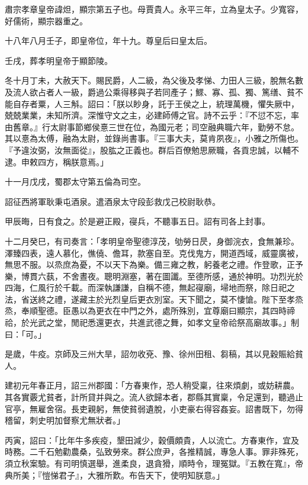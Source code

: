 
\begin{pinyinscope}
肅宗孝章皇帝諱炟，顯宗第五子也。母賈貴人。永平三年，立為皇太子。少寬容，好儒術，顯宗器重之。

十八年八月壬子，即皇帝位，年十九。尊皇后曰皇太后。

壬戌，葬孝明皇帝于顯節陵。

冬十月丁未，大赦天下。賜民爵，人二級，為父後及孝悌、力田人三級，脫無名數及流人欲占者人一級，爵過公乘得移與子若同產子；鰥、寡、孤、獨、篤缮、貧不能自存者粟，人三斛。詔曰：「朕以眇身，託于王侯之上，統理萬機，懼失厥中，兢兢業業，未知所濟。深惟守文之主，必建師傅之官。詩不云乎：『不愆不忘，率由舊章。』行太尉事節鄉侯憙三世在位，為國元老；司空融典職六年，勤勞不怠。其以憙為太傅，融為太尉，並錄尚書事。『三事大夫，莫肯夙夜』，小雅之所傷也。『予違汝弼，汝無面從』，股肱之正義也。群后百僚勉思厥職，各貢忠誠，以輔不逮。申敕四方，稱朕意焉。」

十一月戊戌，蜀郡太守第五倫為司空。

詔征西將軍耿秉屯酒泉。遣酒泉太守段彭救戊己校尉耿恭。

甲辰晦，日有食之。於是避正殿，寑兵，不聽事五日。詔有司各上封事。

十二月癸巳，有司奏言：「孝明皇帝聖德淳茂，劬勞日昃，身御浣衣，食無兼珍。澤臻四表，遠人慕化，僬僥、儋耳，款塞自至。克伐鬼方，開道西域，威靈廣被，無思不服。以烝庶為憂，不以天下為樂。備三雍之教，躬養老之禮。作登歌，正予樂，博貫六蓺，不舍晝夜。聰明淵塞，著在圖讖。至德所感，通於神明。功烈光於四海，仁風行於千載。而深執謙謙，自稱不德，無起寑廟，埽地而祭，除日祀之法，省送終之禮，遂藏主於光烈皇后更衣別室。天下聞之，莫不悽愴。陛下至孝烝烝，奉順聖德。臣愚以為更衣在中門之外，處所殊別，宜尊廟曰顯宗，其四時禘祫，於光武之堂，閒祀悉還更衣，共進武德之舞，如孝文皇帝祫祭高廟故事。」制曰：「可。」

是歲，牛疫。京師及三州大旱，詔勿收兗、豫、徐州田租、芻稿，其以見穀賑給貧人。

建初元年春正月，詔三州郡國：「方春東作，恐人稍受稟，往來煩劇，或妨耕農。其各實覈尤貧者，計所貸并與之。流人欲歸本者，郡縣其實稟，令足還到，聽過止官亭，無雇舍宿。長吏親躬，無使貧弱遺脫，小吏豪右得容姦妄。詔書既下，勿得稽留，刺史明加督察尤無狀者。」

丙寅，詔曰：「比年牛多疾疫，墾田減少，穀價頗貴，人以流亡。方春東作，宜及時務。二千石勉勸農桑，弘致勞來。群公庶尹，各推精誠，專急人事。罪非殊死，須立秋案驗。有司明慎選舉，進柔良，退貪猾，順時令，理冤獄。『五教在寬』，帝典所美；『愷悌君子』，大雅所歎。布告天下，使明知朕意。」


\end{pinyinscope}
